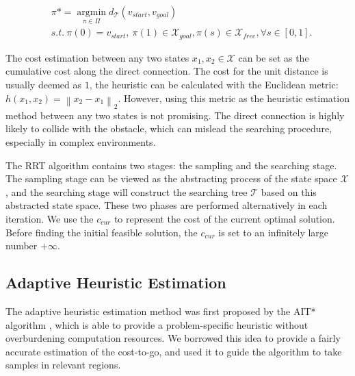 \begin{equation}
    \begin{aligned}
    & \pi* = \operatorname*{\arg \min}_{\pi \in \Pi} d_{\mathcal{T}}(v_{start}, v_{goal}) \\
    & s.t. \ \pi(0) = v_{start}, \ \pi(1) \in \mathcal{X}_{goal}, \pi(s) \in \mathcal{X}_{free},  \forall s \in [0, 1] .
\label{TrajectoryLengthOptimizationObjective}
\end{aligned}
\end{equation}
    

The cost estimation between any two states $x_1, x_2 \in \mathcal{X}$ can be set as the cumulative cost along the direct connection. 
The cost for the unit distance is usually deemed as $1$, the heuristic can be calculated with the Euclidean metric: $ h(x_1, x_2) = \left\| x_2 - x_1 \right\|_2$.
However, using this metric as the heuristic estimation method between any two states is not promising.
The direct connection is highly likely to collide with the obstacle, which can mislead the searching procedure, especially in complex environments.


The RRT algorithm contains two stages: the sampling and the searching stage. The sampling stage can be viewed as the abstracting process of the state space $\mathcal{X}$, and the searching stage will construct the searching tree $\mathcal{T}$ based on this abstracted state space. 
These two phases are performed alternatively in each iteration. 
We use the $c_{cur}$ to represent the cost of the current optimal solution. 
Before finding the initial feasible solution, the $c_{cur}$ is set to an infinitely large number $+\infty$.



\subsection{Adaptive Heuristic Estimation}

The adaptive heuristic estimation method was first proposed by the AIT* algorithm \cite{strub2020adaptively}, which is able to provide a problem-specific heuristic without overburdening computation resources.
We borrowed this idea to provide a fairly accurate estimation of the cost-to-go, and used it to guide the algorithm to take samples in relevant regions.


